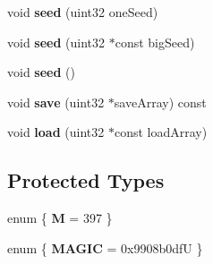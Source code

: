 \begin{DoxyCompactItemize}
\mbox{\label{classMTRand_af79328bada053f0a75ec6575c56029b4}} 
void {\bfseries seed} (uint32 one\+Seed)
\item 
\mbox{\label{classMTRand_a38fd3ace842ddcbdaa534fb925442ecc}} 
void {\bfseries seed} (uint32 $\ast$const big\+Seed)
\item 
\mbox{\label{classMTRand_ad88ea3363d55bafb62826bbd130279c2}} 
void {\bfseries seed} ()
\item 
\mbox{\label{classMTRand_aabe5ec2cad71c1c67d9390a4a235edad}} 
void {\bfseries save} (uint32 $\ast$save\+Array) const
\item 
\mbox{\label{classMTRand_a8302e9a8cd16d8dfc536a85bf2f68be0}} 
void {\bfseries load} (uint32 $\ast$const load\+Array)
\end{DoxyCompactItemize}
\subsection*{Protected Types}
\begin{DoxyCompactItemize}
\item 
\mbox{\label{classMTRand_a10c3437be98225f5b0beee1ed8c033c8}} 
enum \{ {\bfseries M} = 397
 \}
\item 
\mbox{\label{classMTRand_a60fd88469207f761aef84c3fc57c04a3}} 
enum \{ {\bfseries M\+A\+G\+IC} = 0x9908b0dfU
 \}
\end{DoxyCompactItemize}
